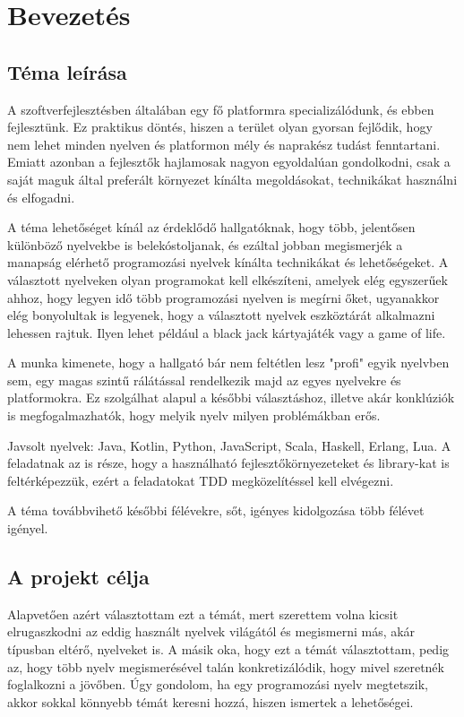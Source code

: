 

\chapter{Bevezetés}
\label{chap:01_Intro}

\section{Téma leírása}
\label{sec:theme_def}

A szoftverfejlesztésben általában egy fő platformra specializálódunk, és ebben fejlesztünk. Ez praktikus döntés, hiszen a terület olyan gyorsan fejlődik, hogy nem lehet minden nyelven és platformon mély és naprakész tudást fenntartani. Emiatt azonban a fejlesztők hajlamosak nagyon egyoldalúan gondolkodni, csak a saját maguk által preferált környezet kínálta megoldásokat, technikákat használni és elfogadni. 

A téma lehetőséget kínál az érdeklődő hallgatóknak, hogy több, jelentősen különböző nyelvekbe is belekóstoljanak, és ezáltal jobban megismerjék a manapság elérhető programozási nyelvek kínálta technikákat és lehetőségeket. A választott nyelveken olyan programokat kell elkészíteni, amelyek elég egyszerűek ahhoz, hogy legyen idő több programozási nyelven is megírni őket, ugyanakkor elég bonyolultak is legyenek, hogy a választott nyelvek eszköztárát alkalmazni lehessen rajtuk. Ilyen lehet például a black jack kártyajáték vagy a game of life. 

A munka kimenete, hogy a hallgató bár nem feltétlen lesz "profi" egyik nyelvben sem, egy magas szintű rálátással rendelkezik majd az egyes nyelvekre és platformokra. Ez szolgálhat alapul a későbbi választáshoz, illetve akár konklúziók is megfogalmazhatók, hogy melyik nyelv milyen problémákban erős. 

Javsolt nyelvek: Java, Kotlin, Python, JavaScript, Scala, Haskell, Erlang, Lua. A feladatnak az is része, hogy a használható fejlesztőkörnyezeteket és library-kat is feltérképezzük, ezért a feladatokat TDD megközelítéssel kell elvégezni.

A téma továbbvihető későbbi félévekre, sőt, igényes kidolgozása több félévet igényel.

\section{A projekt célja}
\label{sec:goal}

Alapvetően azért választottam ezt a témát, mert szerettem volna kicsit elrugaszkodni az eddig használt nyelvek világától és megismerni más, akár típusban eltérő, nyelveket is. A másik oka, hogy ezt a témát választottam, pedig az, hogy több nyelv megismerésével talán konkretizálódik, hogy mivel szeretnék foglalkozni a jövőben. Úgy gondolom, ha egy programozási nyelv megtetszik, akkor sokkal könnyebb témát keresni hozzá, hiszen ismertek a lehetőségei.

